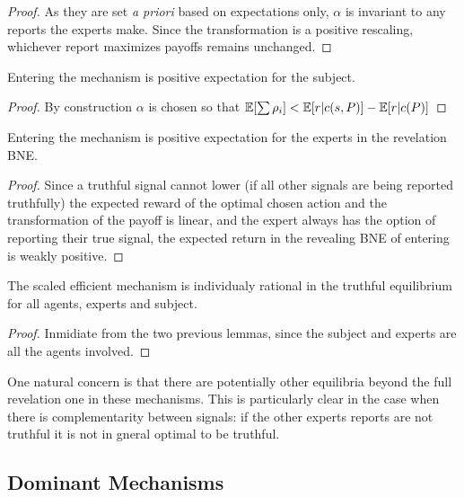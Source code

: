 \begin{proof}
	As they are set \emph{a priori} based on expectations only, $\alpha$ is invariant to any reports the experts make. Since the transformation is a positive rescaling, whichever report maximizes payoffs remains unchanged. 
\end{proof}


\begin{lem}
	Entering the mechanism is positive expectation for the subject.
\end{lem}

\begin{proof}
  By construction $\alpha$ is chosen so that $\operatorname*{\mathbb E}[\sum \rho_i] < \operatorname*{\mathbb E}[r|c(s,P)] - \operatorname*{\mathbb E}[r|c(P)]$
\end{proof}


\begin{lem}
	Entering the mechanism is positive expectation for the experts in the revelation BNE.
\end{lem}

\begin{proof}
Since a truthful signal cannot lower (if all other signals are being reported truthfully) the expected reward of the optimal chosen action and the transformation of the payoff is linear, and the expert always has the option of reporting their true signal, the expected return in the revealing BNE of entering is weakly positive.
\end{proof}


\begin{thm}
	The scaled efficient mechanism is individualy rational in the truthful equilibrium for all agents, experts and subject.
\end{thm}

\begin{proof}
Inmidiate from the two previous lemmas, since the subject and experts are all the agents involved.
\end{proof}

One natural concern is that there are potentially other equilibria beyond the full revelation one in these mechanisms. This is particularly clear in the case when there is complementarity between signals: if the other experts reports are not truthful it is not in gneral optimal to be truthful.


\subsection{Dominant Mechanisms}

